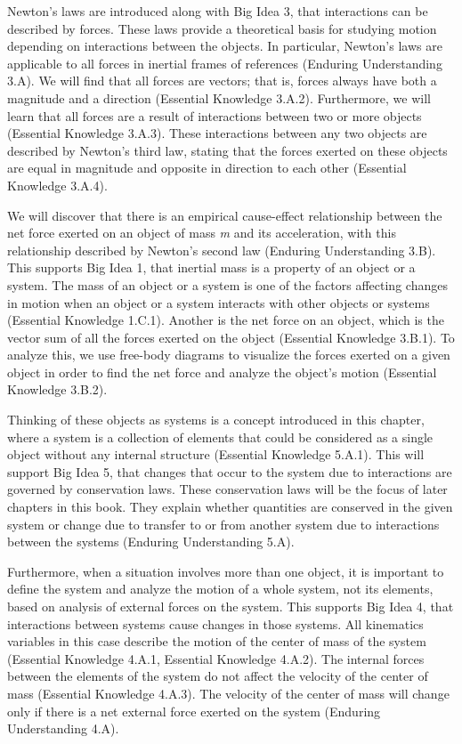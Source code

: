 \documentclass[
]{book}
\begin{document}
Newton's laws are introduced along with Big Idea 3, that interactions
can be described by forces. These laws provide a theoretical basis for
studying motion depending on interactions between the objects. In
particular, Newton's laws are applicable to all forces in inertial
frames of references (Enduring Understanding 3.A). We will find that all
forces are vectors; that is, forces always have both a magnitude and a
direction (Essential Knowledge 3.A.2). Furthermore, we will learn that
all forces are a result of interactions between two or more objects
(Essential Knowledge 3.A.3). These interactions between any two objects
are described by Newton's third law, stating that the forces exerted on
these objects are equal in magnitude and opposite in direction to each
other (Essential Knowledge 3.A.4).

We will discover that there is an empirical cause-effect relationship
between the net force exerted on an object of mass \emph{m} and its
acceleration, with this relationship described by Newton's second law
(Enduring Understanding 3.B). This supports Big Idea 1, that inertial
mass is a property of an object or a system. The mass of an object or a
system is one of the factors affecting changes in motion when an object
or a system interacts with other objects or systems (Essential Knowledge
1.C.1). Another is the net force on an object, which is the vector sum
of all the forces exerted on the object (Essential Knowledge 3.B.1). To
analyze this, we use free-body diagrams to visualize the forces exerted
on a given object in order to find the net force and analyze the
object's motion (Essential Knowledge 3.B.2).

Thinking of these objects as systems is a concept introduced in this
chapter, where a system is a collection of elements that could be
considered as a single object without any internal structure (Essential
Knowledge 5.A.1). This will support Big Idea 5, that changes that occur
to the system due to interactions are governed by conservation laws.
These conservation laws will be the focus of later chapters in this
book. They explain whether quantities are conserved in the given system
or change due to transfer to or from another system due to interactions
between the systems (Enduring Understanding 5.A).

Furthermore, when a situation involves more than one object, it is
important to define the system and analyze the motion of a whole system,
not its elements, based on analysis of external forces on the system.
This supports Big Idea 4, that interactions between systems cause
changes in those systems. All kinematics variables in this case describe
the motion of the center of mass of the system (Essential Knowledge
4.A.1, Essential Knowledge 4.A.2). The internal forces between the
elements of the system do not affect the velocity of the center of mass
(Essential Knowledge 4.A.3). The velocity of the center of mass will
change only if there is a net external force exerted on the system
(Enduring Understanding 4.A).
\end{document}
